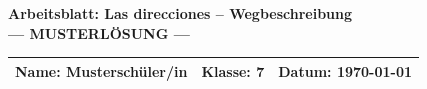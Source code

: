 \documentclass[11pt, a4paper]{article}
\newcommand{\fachfarbe}{spanisch}
\newcommand{\thema}{Las direcciones -- Wegbeschreibung}
\newcommand{\klasse}{7}
\newcommand{\datum}{\today}
\begin{document}

\begin{center}
    {\Large\bfseries\textcolor{\fachfarbe}{Arbeitsblatt: \thema}}\\[0.3em]
    {\large\textcolor{loesung}{\textbf{--- MUSTERLÖSUNG ---}}}
\end{center}

\vspace{5pt}

\noindent
\begin{tabularx}{\textwidth}{|X|X|X|}
\hline
\textbf{Name:} \textcolor{loesung}{Musterschüler/in} &
\textbf{Klasse:} \klasse &
\textbf{Datum:} \datum \\
\hline
\end{tabularx}

\vspace{15pt}

\end{document}
